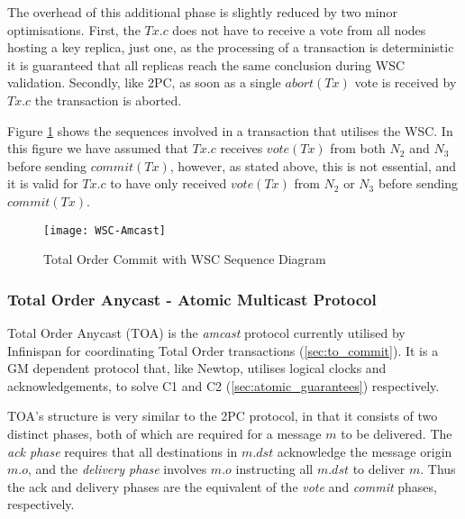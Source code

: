 			The overhead of this additional phase is slightly reduced by two minor optimisations.  First, the $Tx.c$ does not have to receive a vote from all nodes hosting a key replica, just one, as the processing of a transaction is deterministic it is guaranteed that all replicas reach the same conclusion during WSC validation.  Secondly, like 2PC, as soon as a single $abort(Tx)$ vote is received by $Tx.c$ the transaction is aborted.  
			
			Figure \ref{fig:total_order_wsc} shows the sequences involved in a transaction that utilises the WSC.  In this figure we have assumed that $Tx.c$ receives $vote(Tx)$ from both $N_2$ and $N_3$ before sending $commit(Tx)$, however, as stated above, this is not essential, and it is valid for $Tx.c$ to have only received $vote(Tx)$ from $N_2$ or $N_3$ before sending $commit(Tx)$.  
	        
	        \begin{figure}[htbp!] 
                \centering    
                \texttt{[image: WSC-Amcast]}
                \caption[Total Order Commit with Write Skew Check]{Total Order Commit with WSC Sequence Diagram}
                \label{fig:total_order_wsc}
            \end{figure}	      	                         
             
	        \subsubsection{Total Order Anycast - Atomic Multicast Protocol} \label{ssec:TOA_limations}
	        Total Order Anycast (TOA)\cite{Ruivo:2011:ETO:2120967.2121604} is the \emph{amcast} protocol currently utilised by Infinispan for coordinating Total Order transactions (\ref{sec:to_commit}).  It is a GM dependent protocol that, like Newtop\citep{Ezhilchelvan:1995:NFG:876885.880005}, utilises logical clocks and acknowledgements, to solve C1 and C2 (\ref{sec:atomic_guarantees}) respectively.  
	        
			TOA's structure is very similar to the 2PC protocol, in that it consists of two distinct phases, both of which are required for a message $m$ to be delivered.  The \emph{ack phase} requires that all destinations in $m.dst$ acknowledge the message origin $m.o$, and the \emph{delivery phase} involves $m.o$ instructing all $m.dst$ to deliver $m$.  Thus the ack and delivery phases are the equivalent of the \emph{vote} and \emph{commit} phases, respectively.  
	        
